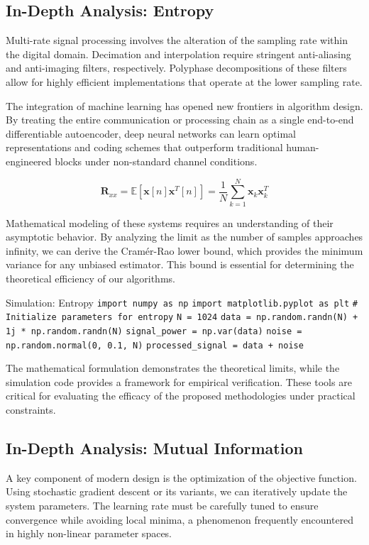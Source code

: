 \subsection{In-Depth Analysis: Entropy}
Multi-rate signal processing involves the alteration of the sampling rate within the digital domain. Decimation and interpolation require stringent anti-aliasing and anti-imaging filters, respectively. Polyphase decompositions of these filters allow for highly efficient implementations that operate at the lower sampling rate.

The integration of machine learning has opened new frontiers in algorithm design. By treating the entire communication or processing chain as a single end-to-end differentiable autoencoder, deep neural networks can learn optimal representations and coding schemes that outperform traditional human-engineered blocks under non-standard channel conditions.

\begin{equation}
    \mathbf{R}_{xx} = \mathbb{E}[\mathbf{x}[n]\mathbf{x}^T[n]] = \frac{1}{N} \sum_{k=1}^{N} \mathbf{x}_k \mathbf{x}_k^T
\end{equation}

Mathematical modeling of these systems requires an understanding of their asymptotic behavior. By analyzing the limit as the number of samples approaches infinity, we can derive the Cramér-Rao lower bound, which provides the minimum variance for any unbiased estimator. This bound is essential for determining the theoretical efficiency of our algorithms.

\begin{pythonbox}{Simulation: Entropy}
\texttt{import numpy as np}
\texttt{import matplotlib.pyplot as plt}
\texttt{}
\texttt{\# Initialize parameters for entropy}
\texttt{N = 1024}
\texttt{data = np.random.randn(N) + 1j * np.random.randn(N)}
\texttt{signal\_power = np.var(data)}
\texttt{noise = np.random.normal(0, 0.1, N)}
\texttt{processed\_signal = data + noise}
\end{pythonbox}

\vspace{0.5cm}
The mathematical formulation demonstrates the theoretical limits, while the simulation code provides a framework for empirical verification. These tools are critical for evaluating the efficacy of the proposed methodologies under practical constraints.


\subsection{In-Depth Analysis: Mutual Information}
A key component of modern design is the optimization of the objective function. Using stochastic gradient descent or its variants, we can iteratively update the system parameters. The learning rate must be carefully tuned to ensure convergence while avoiding local minima, a phenomenon frequently encountered in highly non-linear parameter spaces.

